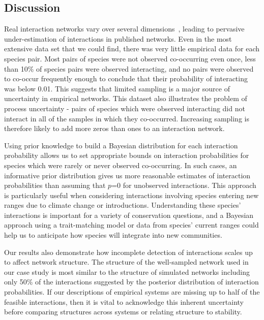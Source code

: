 \documentclass[12pt]{article}
\begin{document}
\begin{spacing}{2.0}
\section*{Discussion}

  Real interaction networks vary over several dimensions~\citep{Kitching1987,Olesen2011a,Pires2011a,Baiser2012,Fodrie2015,Novak2015}, leading to pervasive under-estimation of interactions in published networks. Even in the most extensive data set that we could find, there was very little empirical data for each species pair. Most pairs of species were not observed co-occurring even once, less than 10\% of species pairs were observed interacting, and no pairs were observed to co-occur frequently enough to conclude that their probability of interacting was below 0.01. This suggests that limited sampling is a major source of uncertainty in empirical networks. This dataset also illustrates the problem of process uncertainty - pairs of species which were observed interacting did not interact in all of the samples in which they co-occurred. Increasing sampling is therefore likely to add more zeros than ones to an interaction network.


  Using prior knowledge to build a Bayesian distribution for each interaction probability allows us to set appropriate bounds on interaction probabilities for species which were rarely or never observed co-occurring. In such cases, an informative prior distribution gives us more reasonable estimates of interaction probabilities than assuming that $p$=0 for unobserved interactions. This approach is particularly useful when considering interactions involving species entering new ranges due to climate change or introductions. Understanding these species' interactions is important for a variety of conservation questions, and a Bayesian approach using a trait-matching model or data from species' current ranges could help us to anticipate how species will integrate into new communities. 


  Our results also demonstrate how incomplete detection of interactions scales up to affect network structure. The structure of the well-sampled network used in our case study is most similar to the structure of simulated networks including only 50\% of the interactions suggested by the posterior distribution of interaction probabilities. If our descriptions of empirical systems are missing up to half of the feasible interactions, then it is vital to acknowledge this inherent uncertainty before comparing structures across systems or relating structure to stability.



\end{spacing}
\end{document}
